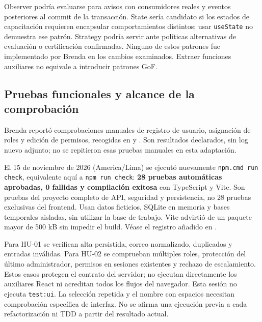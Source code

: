Observer podría evaluarse para avisos con consumidores reales y eventos posteriores al commit de la transacción. State sería candidato si los estados de capacitación requieren encapsular comportamientos distintos; usar \texttt{useState} no demuestra ese patrón. Strategy podría servir ante políticas alternativas de evaluación o certificación confirmadas. Ninguno de estos patrones fue implementado por Brenda en los cambios examinados. Extraer funciones auxiliares no equivale a introducir patrones GoF.

\subsection{Pruebas funcionales y alcance de la comprobación}
Brenda reportó comprobaciones manuales de registro de usuario, asignación de roles y edición de permisos, recogidas en  y . Son resultados declarados, sin log nuevo adjunto; no se repitieron esas pruebas manuales en esta adaptación.

El 15 de noviembre de 2026 (America/Lima) se ejecutó nuevamente \texttt{npm.cmd run check}, equivalente aquí a \texttt{npm run check}: \textbf{28 pruebas automáticas aprobadas, 0 fallidas y compilación exitosa} con TypeScript y Vite. Son pruebas del proyecto completo de API, seguridad y persistencia, no 28 pruebas exclusivas del frontend. Usan datos ficticios, SQLite en memoria y bases temporales aisladas, sin utilizar la base de trabajo. Vite advirtió de un paquete mayor de 500 kB sin impedir el build. Véase el registro añadido en .

Para HU-01 se verifican alta persistida, correo normalizado, duplicados y entradas inválidas. Para HU-02 se comprueban múltiples roles, protección del último administrador, permisos en sesiones existentes y rechazo de escalamiento. Estos casos protegen el contrato del servidor; no ejecutan directamente los auxiliares React ni acreditan todos los flujos del navegador. Esta sesión no ejecuta \texttt{test:ui}. La selección repetida y el nombre con espacios necesitan comprobación específica de interfaz. No se afirma una ejecución previa a cada refactorización ni TDD a partir del resultado actual.

